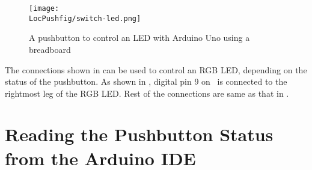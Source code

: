 \begin{figure}
  \centering
  \texttt{[image: \\LocPushfig/switch-led.png]}
  \caption{A pushbutton to control an LED with Arduino Uno using a breadboard}
  \label{fig:switch-led}
\end{figure}
The connections shown in  can be used to control an RGB LED, 
depending on the status of the pushbutton. As shown in , digital
pin 9 on \arduino\ is connected to the rightmost leg of the RGB LED. Rest of the connections
are same as that in . 

\section{Reading the Pushbutton Status from the Arduino IDE}
